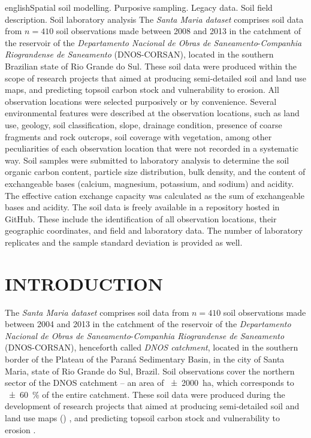 \def\enkeys{Spatial soil modelling. Purposive sampling. Legacy data. Soil field description. Soil laboratory 
analysis}
  
\begin{chapterabstract}{english}{\enkeys}
The \emph{Santa Maria dataset} comprises soil data from $n = 410$ soil observations made between \num{2008} 
and \num{2013} in the catchment of the reservoir of the \textit{Departamento Nacional de Obras de 
Saneamento}-\textit{Companhia Riograndense de Saneamento} (DNOS-CORSAN), located in the southern Brazilian 
state of Rio Grande do Sul. These soil data were produced within the scope of research projects that aimed at 
producing semi-detailed soil and land use maps, and predicting topsoil carbon stock and vulnerability to 
erosion. All observation locations were selected purposively or by convenience. Several environmental 
features were described at the observation locations, such as land use, geology, soil classification, slope, 
drainage condition, presence of coarse fragments and rock outcrops, soil coverage with vegetation, among 
other peculiarities of each observation location that were not recorded in a systematic way. Soil samples were 
submitted to laboratory analysis to determine the soil organic carbon content, particle size distribution, 
bulk density, and the content of exchangeable bases (calcium, magnesium, potassium, and sodium) and acidity. 
The effective cation exchange capacity was calculated as the sum of exchangeable bases and acidity. The soil 
data is freely available in a repository hosted in GitHub. These include the identification of all observation 
locations, their geographic coordinates, and field and laboratory data. The number of laboratory replicates 
and the sample standard deviation is provided as well.
\end{chapterabstract}

\formatchapter

\section{INTRODUCTION}
\label{sec:chap04-introduction}

The \emph{Santa Maria dataset} comprises soil data from $n = 410$ soil observations made between \num{2004} 
and \num{2013} in the catchment of the reservoir of the \textit{Departamento Nacional de Obras de 
Saneamento}-\textit{Companhia Riograndense de Saneamento} (DNOS-CORSAN), henceforth called \emph{DNOS 
catchment}, located in the southern border of the Plateau of the Paraná Sedimentary Basin, in the city of 
Santa Maria, state of Rio Grande do Sul, Brazil. Soil observations cover the northern sector of the DNOS 
catchment -- an area of \SI{\pm2000}{\hectare}, which corresponds to \SI{\pm60}{\percent} of the entire 
catchment. These soil data were produced during the development of research projects that aimed at producing 
semi-detailed soil and land use maps () \cite{Pedron2005, Miguel2010, SamuelRosaEtAl2011a, 
MiguelEtAl2012}, and predicting topsoil carbon stock and vulnerability to erosion \cite{Samuel-Rosa2009, 
MouraBueno2012, Miguel2013}.

